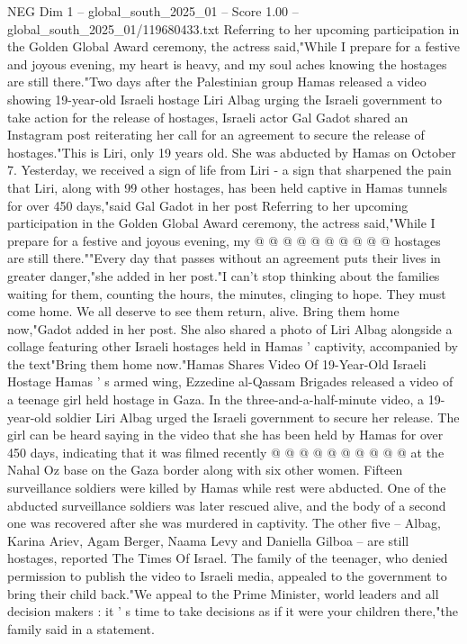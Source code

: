 \begin{textsample}{NEG Dim 1 – global\_south\_2025\_01 – Score 1.00 – global\_south\_2025\_01/119680433.txt}  \label{ex:f1_neg_148}
Referring to her upcoming participation in the Golden Global Award ceremony, the actress said,"While I prepare for a festive and joyous evening, my heart is heavy, and my soul aches knowing the hostages are still there."Two days after the Palestinian group Hamas released a video showing 19-year-old Israeli hostage Liri Albag urging the Israeli government to take action for the release of hostages, Israeli actor Gal Gadot shared an Instagram post reiterating her call for an agreement to secure the release of hostages."This is Liri, only 19 years old.
She was abducted by Hamas on October 7.
Yesterday, we received a sign of life from Liri - a sign that sharpened the pain that Liri, along with 99 other hostages, has been held captive in Hamas tunnels for over 450 days,"said Gal Gadot in her post Referring to her upcoming participation in the Golden Global Award ceremony, the actress said,"While I prepare for a festive and joyous evening, my @ @ @ @ @ @ @ @ @ @ hostages are still there.""Every day that passes without an agreement puts their lives in greater danger,"she added in her post."I can't stop thinking about the families waiting for them, counting the hours, the minutes, clinging to hope.
They must come home.
We all deserve to see them return, alive.
Bring them home now,"Gadot added in her post.
She also shared a photo of Liri Albag alongside a collage featuring other Israeli hostages held in Hamas ' captivity, accompanied by the text"Bring them home now."Hamas Shares Video Of 19-Year-Old Israeli Hostage Hamas ' s armed wing, Ezzedine al-Qassam Brigades released a video of a teenage girl held hostage in Gaza.
In the three-and-a-half-minute video, a 19-year-old soldier Liri Albag urged the Israeli government to secure her release.
The girl can be heard saying in the video that she has been held by Hamas for over 450 days, indicating that it was filmed recently @ @ @ @ @ @ @ @ @ @ at the Nahal Oz base on the Gaza border along with six other women.
Fifteen surveillance soldiers were killed by Hamas while rest were abducted.
One of the abducted surveillance soldiers was later rescued alive, and the body of a second one was recovered after she was murdered in captivity.
The other five -- Albag, Karina Ariev, Agam Berger, Naama Levy and Daniella Gilboa -- are still hostages, reported The Times Of Israel.
The family of the teenager, who denied permission to publish the video to Israeli media, appealed to the government to bring their child back."We appeal to the Prime Minister, world leaders and all decision makers : it ' s time to take decisions as if it were your children there,"the family said in a statement.

\end{textsample}

